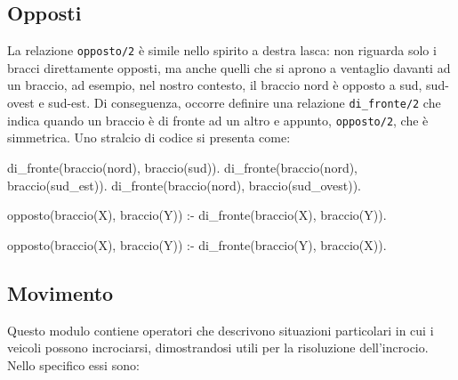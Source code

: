 \subsection{Opposti}
La relazione \texttt{opposto/2} è simile nello spirito a destra lasca: non riguarda solo i bracci direttamente opposti, ma anche quelli che si aprono a ventaglio davanti ad un braccio, ad esempio, nel nostro contesto, il braccio nord è opposto a sud, sud-ovest e sud-est. Di conseguenza, occorre definire una relazione \texttt{di\_fronte/2} che indica quando un braccio è di fronte ad un altro e appunto, \texttt{opposto/2}, che è simmetrica. Uno stralcio di codice si presenta come:

\begin{verbatimtab}
di_fronte(braccio(nord), braccio(sud)).
di_fronte(braccio(nord), braccio(sud_est)).
di_fronte(braccio(nord), braccio(sud_ovest)).

opposto(braccio(X), braccio(Y)) :-
	di_fronte(braccio(X), braccio(Y)).

opposto(braccio(X), braccio(Y)) :-
	di_fronte(braccio(Y), braccio(X)).
\end{verbatimtab}

\subsection{Movimento}
\label{ssec:pos}
Questo modulo contiene operatori che descrivono situazioni particolari in cui i veicoli possono incrociarsi, dimostrandosi utili per la risoluzione dell'incrocio. Nello specifico essi sono:

